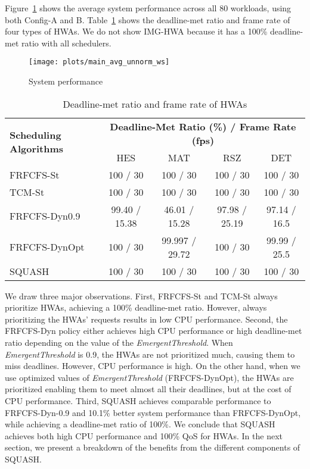 \documentclass[10pt,letterpaper]{article}
\newcommand{\MODIFIEDISCA}[1]{#1}
\begin{document}
Figure~\ref{plot:average_performance} shows the
average system performance across all 80 workloads, using both
Config-A and B. Table~\ref{tab:average_hwa_performance} shows the deadline-met
ratio and frame rate of four types of HWAs. We do not show IMG-HWA because it
has a 100\% deadline-met ratio with all schedulers.


\begin{figure}[ht!]
  \centering
  \texttt{[image: plots/main\_avg\_unnorm\_ws]}
\caption{System performance}
  \label{plot:average_performance}
\end{figure}





\begin{table}[h]
\footnotesize
\centering
\setlength{\tabcolsep}{.60em}
    \begin{tabular}{lcccc}
      \toprule
\multirow{2}{*}{\textbf{Scheduling Algorithms}} &
      \multicolumn{4}{c}{\textbf{Deadline-Met Ratio (\%) / Frame Rate (fps)}} \\
       & HES & MAT & RSZ & DET \\
      \midrule

    FRFCFS-St & 100 / 30 & 100 / 30 & 100 / 30 & 100 / 30 \\
    TCM-St & 100 / 30 & 100 / 30 & 100 / 30 & 100 / 30 \\
    FRFCFS-Dyn0.9 & 99.40 / 15.38 & 46.01 / 15.28 & 97.98 / 25.19 & 97.14 / 16.5 \\
    FRFCFS-DynOpt & 100 / 30 & 99.997 / 29.72 & 100 / 30 & 99.99 / 25.5 \\
SQUASH & 100 / 30 & 100 / 30 & 100 / 30 & 100 / 30 \\

      \bottomrule
    \end{tabular}
\vspace{-2mm}
\caption{Deadline-met ratio and frame rate of HWAs}
\label{tab:average_hwa_performance}\end{table}




 

We draw three major observations. First, FRFCFS-St and TCM-St always prioritize
HWAs, achieving a 100\% deadline-met ratio. However, always prioritizing the
HWAs' requests results in low CPU performance. Second, the FRFCFS-Dyn policy either
achieves high CPU performance or high deadline-met ratio depending on the value
of the {\it EmergentThreshold}. When {\it EmergentThreshold} is 0.9, the HWAs
are not prioritized much, causing them to miss deadlines. However, CPU
performance is high. 
\MODIFIEDISCA{On the other hand, when we use optimized values of {\it
EmergentThreshold} (FRFCFS-DynOpt), the HWAs are prioritized enabling them to
meet almost all their deadlines, but at the cost of CPU performance. Third,
SQUASH achieves comparable performance to FRFCFS-Dyn-0.9 and 10.1\% better
system performance than FRFCFS-DynOpt, while achieving a deadline-met ratio of
100\%. 
We conclude that SQUASH achieves both high CPU performance and 100\% QoS for
HWAs. In the next section, we present a breakdown of the benefits from the
different components of SQUASH.}
\end{document}
